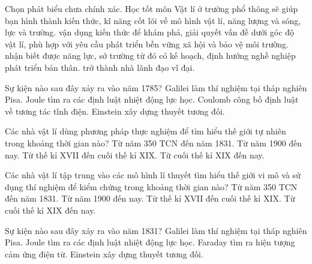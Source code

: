 \begin{ex}
Chọn phát biểu chưa chính xác. Học tốt môn Vật lí ở trường phổ thông sẽ giúp bạn
\choice
{hình thành kiến thức, kĩ năng cốt lõi về mô hình vật lí, năng lượng và sóng, lực và trường.}
{vận dụng kiến thức để khám phá, giải quyết vấn đề dưới góc độ vật lí, phù hợp với yêu cầu phát triển bền vững xã hội và bảo vệ môi trường.}
{nhận biết được năng lực, sở trường từ đó có kế hoạch, định hướng nghề nghiệp phát triển bản thân.}
{\True trở thành nhà lãnh đạo vĩ đại.}
\end{ex}

\begin{ex}
Sự kiện nào sau đây xảy ra vào năm 1785?
\choice
{Galilei làm thí nghiệm tại tháp nghiên Pisa.}
{Joule tìm ra các định luật nhiệt động lực học.}
{\True Coulomb công bố định luật về tương tác tĩnh điện.}
{Einstein xây dựng thuyết tương đối.}
\end{ex}

\begin{ex}
Các nhà vật lí dùng phương pháp thực nghiệm để tìm hiểu thế giới tự nhiên trong khoảng thời gian nào?
\choice
{Từ năm 350 TCN đến năm 1831.}
{Từ năm 1900 đến nay.}
{\True Từ thế kỉ XVII đến cuối thế kỉ XIX.}
{Từ cuối thế kỉ XIX đến nay.}
\end{ex}

\begin{ex}
Các nhà vật lí tập trung vào các mô hình lí thuyết tìm hiểu thế giới vi mô và sử dụng thí nghiệm để kiểm chứng trong khoảng thời gian nào?
\choice
{Từ năm 350 TCN đến năm 1831.}
{\True Từ năm 1900 đến nay.}
{Từ thế kỉ XVII đến cuối thế kỉ XIX.}
{Từ cuối thế kỉ XIX đến nay.}
\end{ex}

\begin{ex}
Sự kiện nào sau đây xảy ra vào năm 1831?
\choice
{Galilei làm thí nghiệm tại tháp nghiên Pisa.}
{Joule tìm ra các định luật nhiệt động lực học.}
{\True Faraday tìm ra hiện tượng cảm ứng điện từ.}
{Einstein xây dựng thuyết tương đối.}
\end{ex}

